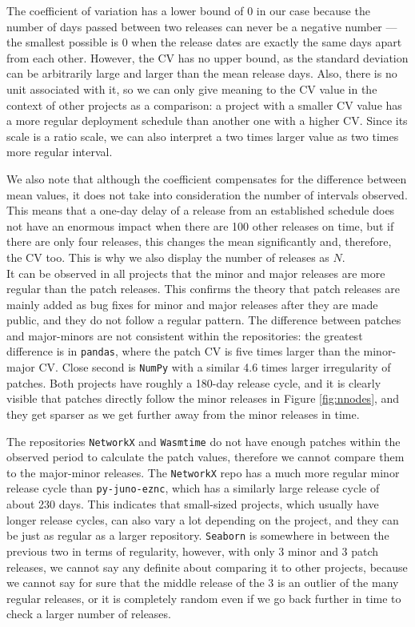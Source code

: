 The coefficient of variation has a lower bound of $0$ in our case because the number of days passed between two releases can never be a negative number — the smallest possible is $0$ when the release dates are exactly the same days apart from each other. However, the CV has no upper bound, as the standard deviation can be arbitrarily large and larger than the mean release days. Also, there is no unit associated with it, so we can only give meaning to the CV value in the context of other projects as a comparison: a project with a smaller CV value has a more regular deployment schedule than another one with a higher CV. Since its scale is a ratio scale, we can also interpret a two times larger value as two times more regular interval.

We also note that although the coefficient compensates for the difference between mean values, it does not take into consideration the number of intervals observed. This means that a one-day delay of a release from an established schedule does not have an enormous impact when there are 100 other releases on time, but if there are only four releases, this changes the mean significantly and, therefore, the CV too. This is why we also display the number of releases as $N$. \\

It can be observed in all projects that the minor and major releases are more regular than the patch releases. This confirms the theory that patch releases are mainly added as bug fixes for minor and major releases after they are made public, and they do not follow a regular pattern. The difference between patches and major-minors are not consistent within the repositories: the greatest difference is in \texttt{pandas}, where the patch CV is five times larger than the minor-major CV. Close second is \texttt{NumPy} with a similar 4.6 times larger irregularity of patches. Both projects have roughly a 180-day release cycle, and it is clearly visible that patches directly follow the minor releases in Figure \ref{fig:nnodes}, and they get sparser as we get further away from the minor releases in time.

The repositories \texttt{NetworkX} and \texttt{Wasmtime} do not have enough patches within the observed period to calculate the patch values, therefore we cannot compare them to the major-minor releases. The \texttt{NetworkX} repo has a much more regular minor release cycle than \texttt{py-juno-eznc}, which has a similarly large release cycle of about 230 days. This indicates that small-sized projects, which usually have longer release cycles, can also vary a lot depending on the project, and they can be just as regular as a larger repository. \texttt{Seaborn} is somewhere in between the previous two in terms of regularity, however, with only 3 minor and 3 patch releases, we cannot say any definite about comparing it to other projects, because we cannot say for sure that the middle release of the 3 is an outlier of the many regular releases, or it is completely random even if we go back further in time to check a larger number of releases.

